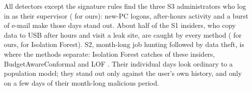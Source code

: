 All detectors except the signature rules find the three S3 administrators who log in as their
supervisor (\DROursSThree{} for ours): new-PC logons, after-hours activity and a burst of e-mail make
those days stand out. About half of the S1 insiders, who copy data to USB after hours and visit a leak
site, are caught by every method (\DROursSOne{} for ours, \DRIFSOne{} for Isolation Forest). S2,
month-long job hunting followed by data theft, is where the methods separate: Isolation Forest
catches \DRIFSTwo{} of these insiders, BudgetAwareConformal \DROursSTwo{} and LOF \DRLOFSTwo. Their
individual days look ordinary to a population model; they stand out only against the user's own
history, and only on a few days of their month-long malicious period.
